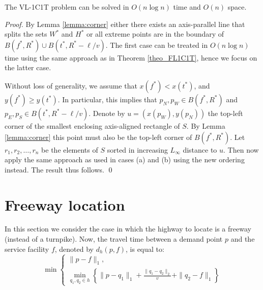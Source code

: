 \documentclass{llncs}
\newcommand{\x}[1]{x({#1})}
\newcommand{\y}[1]{y({#1})}
\newcommand{\ball}[1]{B({#1})}
\begin{document}
\begin{theorem}\label{theo_vl1C1T}
The VL-1C1T problem can be solved in $O(n\log n)$ time and $O(n)$ space.
\end{theorem}
\begin{proof}
By Lemma \ref{lemma:corner} either there exists an axis-parallel line that splits the sets $W^*$ and $H^*$ or all extreme points are in the boundary of $\ball{f^*,R^*} \cup \ball{t^*,R^*-\ell/v}$. The first case can be treated in  $O(n\log n)$ time using the same approach as in Theorem \ref{theo_FL1C1T}, hence we focus on the latter case.

Without loss of generality, we assume that $\x{f^*}<\x{t^*}$, and $\y{f^*}\geq\y{t^*}$.
In particular, this implies that $p_N, p_W \in B(f^*,R^*)$ and $p_E, p_S \in B(t^*,R^*-\ell/v)$. Denote by $u=(x(p_W),y(p_N))$ the top-left corner of the smallest enclosing axis-aligned rectangle of $S$. By Lemma \ref{lemma:corner} this point must also be the top-left corner of $B(f^*,R^*)$. Let $r_1, r_2,\dots, r_n$ be the elements of $S$ sorted in increasing $L_\infty$ distance to $u$. Then now apply the same approach as used in cases (a) and (b) using the new ordering instead. The result thus follows. \qed
\end{proof}
\section{Freeway location}


In this section we consider the case in which the highway to locate is a freeway (instead of a turnpike).
Now, the travel time between a demand point $p$ and the
service facility $f$, denoted by $d_h(p,f)$, is equal to:
\begin{equation}\label{eq1}
\min\left\{
\begin{array}{l}
\|p-f\|_1,\\
\min_{q_1,q_2\in
h}\left\{\|p-q_1\|_1+\frac{\|q_1-q_2\|_2}{v}+\|q_2-f\|_1\right\}
\end{array}
\right.
\end{equation}
\end{document}
